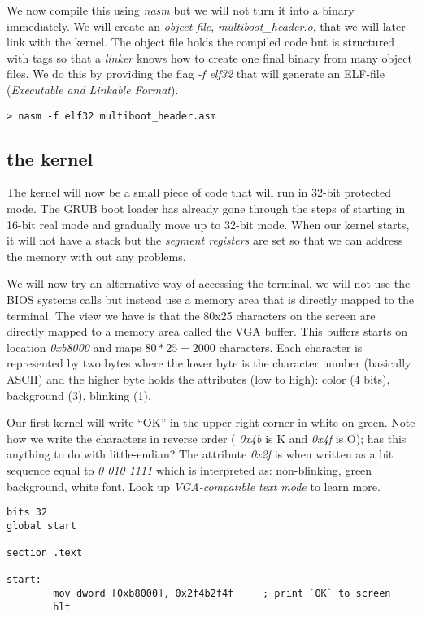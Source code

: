 \documentclass[a4paper,11pt]{article}
\begin{document}
We now compile this using {\em nasm} but we will not turn it into a
binary immediately. We will create an {\em object file}, {\em
  multiboot\_header.o}, that we will later link with the kernel. The
object file holds the compiled code but is structured with tags so
that a {\em linker} knows how to create one final binary from many
object files. We do this by providing the flag {\em -f elf32} that
will generate an ELF-file ({\em Executable and Linkable Format}).

\begin{verbatim}
> nasm -f elf32 multiboot_header.asm 
\end{verbatim}

\subsection{the kernel}

The kernel will now be a small piece of code that will run in 32-bit
protected mode. The GRUB boot loader has already gone through the
steps of starting in 16-bit real mode and gradually move up to 32-bit
mode. When our kernel starts, it will not have a stack but the {\em
  segment registers} are set so that we can address the memory with
out any problems.

We will now try an alternative way of accessing the terminal, we will
not use the BIOS systems calls but instead use a memory area that is
directly mapped to the terminal. The view we have is that the 80x25
characters on the screen are directly mapped to a memory area called
the VGA buffer. This buffers starts on location {\em 0xb8000} and maps
$80 * 25 = 2000$ characters. Each character is represented by two
bytes where the lower byte is the character number (basically ASCII)
and the higher byte holds the attributes (low to high): color (4
bits), background (3), blinking (1),

Our first kernel will write ``OK'' in the upper right corner in white
on green. Note how we write the characters in reverse order ({\em
  0x4b} is K and {\em 0x4f} is O); has this anything to do with
little-endian? The attribute {\em 0x2f} is when written as a bit
sequence equal to {\em 0 010 1111} which is interpreted as:
non-blinking, green background, white font. Look up {\em VGA-compatible
text mode} to learn more.

\begin{verbatim}
bits 32
global start

section .text

start:
        mov dword [0xb8000], 0x2f4b2f4f     ; print `OK` to screen
        hlt
\end{verbatim}
\end{document}
